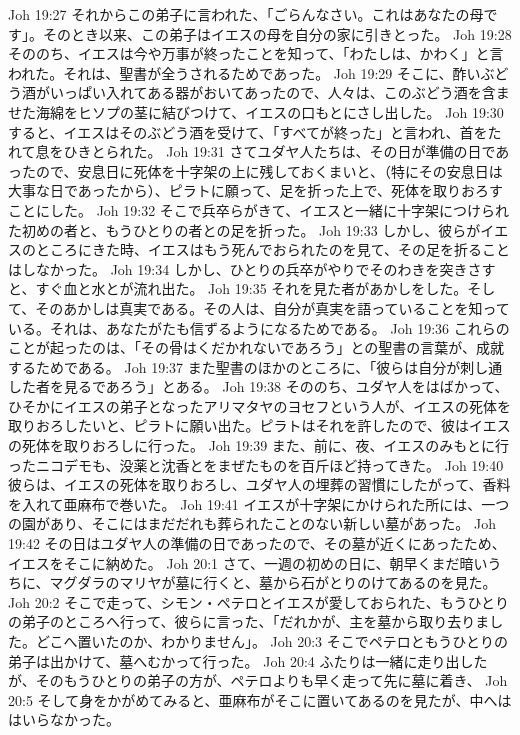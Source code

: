 Joh 19:27  それからこの弟子に言われた、「ごらんなさい。これはあなたの母です」。そのとき以来、この弟子はイエスの母を自分の家に引きとった。
Joh 19:28  そののち、イエスは今や万事が終ったことを知って、「わたしは、かわく」と言われた。それは、聖書が全うされるためであった。
Joh 19:29  そこに、酢いぶどう酒がいっぱい入れてある器がおいてあったので、人々は、このぶどう酒を含ませた海綿をヒソプの茎に結びつけて、イエスの口もとにさし出した。
Joh 19:30  すると、イエスはそのぶどう酒を受けて、「すべてが終った」と言われ、首をたれて息をひきとられた。
Joh 19:31  さてユダヤ人たちは、その日が準備の日であったので、安息日に死体を十字架の上に残しておくまいと、（特にその安息日は大事な日であったから）、ピラトに願って、足を折った上で、死体を取りおろすことにした。
Joh 19:32  そこで兵卒らがきて、イエスと一緒に十字架につけられた初めの者と、もうひとりの者との足を折った。
Joh 19:33  しかし、彼らがイエスのところにきた時、イエスはもう死んでおられたのを見て、その足を折ることはしなかった。
Joh 19:34  しかし、ひとりの兵卒がやりでそのわきを突きさすと、すぐ血と水とが流れ出た。
Joh 19:35  それを見た者があかしをした。そして、そのあかしは真実である。その人は、自分が真実を語っていることを知っている。それは、あなたがたも信ずるようになるためである。
Joh 19:36  これらのことが起ったのは、「その骨はくだかれないであろう」との聖書の言葉が、成就するためである。
Joh 19:37  また聖書のほかのところに、「彼らは自分が刺し通した者を見るであろう」とある。
Joh 19:38  そののち、ユダヤ人をはばかって、ひそかにイエスの弟子となったアリマタヤのヨセフという人が、イエスの死体を取りおろしたいと、ピラトに願い出た。ピラトはそれを許したので、彼はイエスの死体を取りおろしに行った。
Joh 19:39  また、前に、夜、イエスのみもとに行ったニコデモも、没薬と沈香とをまぜたものを百斤ほど持ってきた。
Joh 19:40  彼らは、イエスの死体を取りおろし、ユダヤ人の埋葬の習慣にしたがって、香料を入れて亜麻布で巻いた。
Joh 19:41  イエスが十字架にかけられた所には、一つの園があり、そこにはまだだれも葬られたことのない新しい墓があった。
Joh 19:42  その日はユダヤ人の準備の日であったので、その墓が近くにあったため、イエスをそこに納めた。
Joh 20:1  さて、一週の初めの日に、朝早くまだ暗いうちに、マグダラのマリヤが墓に行くと、墓から石がとりのけてあるのを見た。
Joh 20:2  そこで走って、シモン・ペテロとイエスが愛しておられた、もうひとりの弟子のところへ行って、彼らに言った、「だれかが、主を墓から取り去りました。どこへ置いたのか、わかりません」。
Joh 20:3  そこでペテロともうひとりの弟子は出かけて、墓へむかって行った。
Joh 20:4  ふたりは一緒に走り出したが、そのもうひとりの弟子の方が、ペテロよりも早く走って先に墓に着き、
Joh 20:5  そして身をかがめてみると、亜麻布がそこに置いてあるのを見たが、中へははいらなかった。
